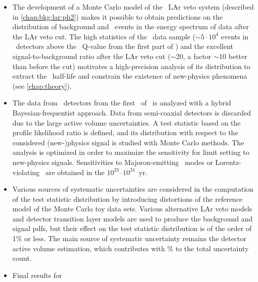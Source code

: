 \begin{table}
  \centering
  \caption{%
    90\% C.L.~lower limits for Majoron-emitting \onbb\ modes contributing to the \nnbb\
    event distribution. Nuclear matrix elements for $n=1$ are the same as the standard
    \onbb, and have been therefore selected from the most recent nuclear calculations.
    Matrix elements for the other decay modes have been taken from~\cite{Hirsch1995}.
    Phase space factors have been taken from~\cite{Kotila2015}. \fillme{numbers}
  }\label{tab:2nbb-ana:onbbx:limits}
  
\end{table}

\chapsummary
\begin{itemize}
  \item The development of a Monte Carlo model of the \gerda\ LAr veto system (described
    in \cref{chap:bkg:lar:ph2}) makes it possible to obtain predictions on the
    distribution of background and \nnbb\ events in the energy spectrum of data after the
    LAr veto cut. The high statistics of the \nnbb\ data sample ($\sim$$5 \cdot 10^4$
    events in \bege\ detectors above the \Arl\ Q-value from the first part of \phasetwo)
    and the excellent signal-to-background ratio after the LAr veto cut ($\sim$20, a
    factor $\sim$10 better than before the cut) motivates a high-precision analysis of its
    distribution to extract the \nnbb\ half-life and constrain the existence of
    new-physics phenomena (see \cref{chap:theory}).
  \item The data from \bege\ detectors from the first \gexpophasetwobkg\ of \phasetwo\
    is analyzed with a hybrid Bayesian-frequentist approach. Data from semi-coaxial
    detectors is discarded due to the large active volume uncertainties. A test statistic
    based on the profile likelihood ratio is defined, and its distribution with respect to
    the considered (new-)physics signal is studied with Monte Carlo methods. The analysis
    is optimized in order to maximize the sensitivity for limit setting to new-physics
    signals. Sensitivities to Majoron-emitting \onbb\ modes or Lorentz-violating \nnbb\
    are obtained in the $10^{23}$--$10^{24}$~yr.
  \item Various sources of systematic uncertainties are considered in the computation of
    the test statistic distribution by introducing distortions of the reference model of
    the Monte Carlo toy data sets. Various alternative LAr veto models and detector
    transition layer models are used to produce the background and signal pdfs, but their
    effect on the test statistic distribution is of the order of 1\% or less. The main
    source of systematic uncertainty remains the detector active volume estimation, which
    contributes with \fillme{?}\% to the total uncertainty count.
  \item Final results for \thalftwo\ \fillme{\ldots}
\end{itemize}


